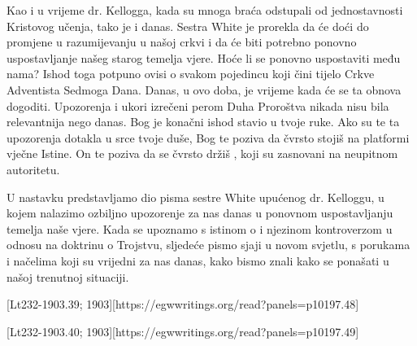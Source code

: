 Kao i u vrijeme dr. Kellogga, kada su mnoga braća odstupali od jednostavnosti Kristovog učenja, tako je i danas. Sestra White je prorekla da će doći do promjene u razumijevanju  u našoj crkvi i da će biti potrebno ponovno uspostavljanje našeg starog temelja vjere. Hoće li se  ponovno uspostaviti među nama? Ishod toga potpuno ovisi o svakom pojedincu koji čini tijelo Crkve Adventista Sedmoga Dana. Danas, u ovo doba, je vrijeme kada će se ta obnova dogoditi. Upozorenja i ukori izrečeni perom Duha Proroštva nikada nisu bila relevantnija nego danas. Bog je konačni ishod stavio u tvoje ruke. Ako su te ta upozorenja dotakla u srce tvoje duše, Bog te poziva da čvrsto stojiš na platformi vječne Istine. On te poziva da se čvrsto držiš , koji su zasnovani na neupitnom autoritetu.

U nastavku predstavljamo dio pisma sestre White upućenog dr. Kelloggu, u kojem nalazimo ozbiljno upozorenje za nas danas u ponovnom uspostavljanju temelja naše vjere. Kada se upoznamo s istinom o  i njezinom kontroverzom u odnosu na doktrinu o Trojstvu, sljedeće pismo sjaji u novom svjetlu, s porukama i načelima koji su vrijedni za nas danas, kako bismo znali kako se ponašati u našoj trenutnoj situaciji.


[Lt232-1903.39; 1903][https://egwwritings.org/read?panels=p10197.48]

[Lt232-1903.40; 1903][https://egwwritings.org/read?panels=p10197.49]

